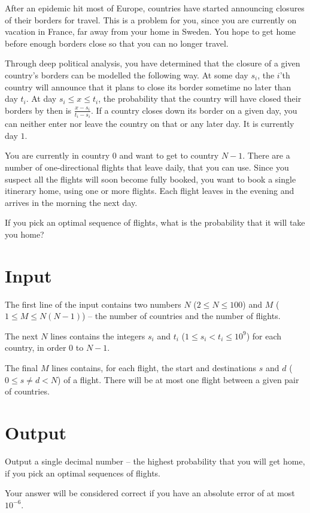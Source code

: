 After an epidemic hit most of Europe, countries have started announcing closures of their borders for travel.
This is a problem for you, since you are currently on vacation in France, far away from your home in Sweden.
You hope to get home before enough borders close so that you can no longer travel.

Through deep political analysis, you have determined that the closure of a given country's borders can be modelled the following way.
At some day $s_i$, the $i$'th country will announce that it plans to close its border sometime no later than day $t_i$.
At day $s_i \le x \le t_i$, the probability that the country will have closed their borders by then is $\frac{x - s_i}{t_i - s_i}$.
If a country closes down its border on a given day, you can neither enter nor leave the country on that or any later day.
It is currently day $1$.

You are currently in country $0$ and want to get to country $N - 1$.
There are a number of one-directional flights that leave daily, that you can use.
Since you suspect all the flights will soon become fully booked, you want to book a single itinerary home, using one or more flights.
Each flight leaves in the evening and arrives in the morning the next day.

If you pick an optimal sequence of flights, what is the probability that it will take you home?

\section*{Input}
The first line of the input contains two numbers $N$ ($2 \le N \le 100$) and $M$ ($1 \le M \le N(N-1)$)  -- the number of countries and the number of flights.

The next $N$ lines contains the integers $s_i$ and $t_i$ ($1 \le s_i < t_i \le 10^9$) for each country, in order $0$ to $N - 1$.

The final $M$ lines contains, for each flight, the start and destinations $s$ and $d$ ($0 \le s \neq d < N$) of a flight.
There will be at most one flight between a given pair of countries.

\section{Output}
Output a single decimal number -- the highest probability that you will get home, if you pick an optimal sequences of flights.

Your answer will be considered correct if you have an absolute error of at most ${10}^{-6}$.
